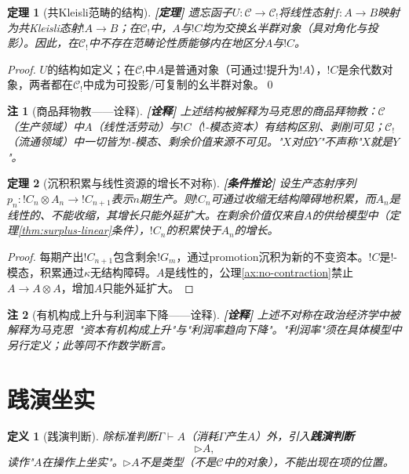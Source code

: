 \documentclass[11pt,a4paper]{article}
\newtheorem{definition}{定义}
\newtheorem{theorem}{定理}
\newtheorem{remark}{注}
\newcommand{\lvl}[1]{\hfill\textbf{\footnotesize[#1]}}
\newcommand{\lvP}{\lvl{定理}}
\newcommand{\lvC}{\lvl{条件推论}}
\newcommand{\lvI}{\lvl{诠释}}
\newcommand{\cat}[1]{\mathcal{#1}}
\newcommand{\C}{\cat{C}}
\newcommand{\bang}{{!}}
\newcommand{\tensor}{\otimes}
\newcommand{\coKl}[1]{\C_{\bang}}
\begin{document}
\begin{theorem}[共Kleisli范畴的结构]\label{thm:fetishism}\lvP
遗忘函子$U:\C\to\coKl{!}$将线性态射$f:A\to B$映射为共Kleisli态射$\bang A\to B$；在$\coKl{!}$中，$A$与$\bang C$均为交换幺半群对象（具对角化与投影）。因此，在$\coKl{!}$中不存在范畴论性质能够内在地区分$A$与$\bang C$。
\end{theorem}

\begin{proof}
$U$的结构如定义；在$\coKl{!}$中$A$是普通对象（可通过$\bang$提升为$\bang A$），$\bang C$是余代数对象，两者都在$\coKl{!}$中成为可投影/可复制的幺半群对象。\qed
\end{proof}

\begin{remark}[商品拜物教——诠释]\lvI
上述结构被解释为马克思的商品拜物教：$\C$（生产领域）中$A$（线性活劳动）与$\bang C$（$\bang$-模态资本）有结构区别、剥削可见；$\coKl{!}$（流通领域）中一切皆为$\bang$-模态、剩余价值来源不可见。"$X$对应$Y$"不声称"$X$就是$Y$"。
\end{remark}

\begin{theorem}[沉积积累与线性资源的增长不对称]\label{thm:organic-composition}\lvC
设生产态射序列$p_n:\bang C_n\tensor A_n\to\bang C_{n+1}$表示$n$期生产。则$\bang C_n$可通过收缩无结构障碍地积累，而$A_n$是线性的、不能收缩，其增长只能外延扩大。在剩余价值仅来自$A$的供给模型中（定理\ref{thm:surplus-linear}条件），$\bang C_n$的积累快于$A_n$的增长。
\end{theorem}

\begin{proof}
每期产出$\bang C_{n+1}$包含剩余$\bang G_m$，通过promotion沉积为新的不变资本。$\bang C$是$\bang$-模态，积累通过$\kappa$无结构障碍。$A$是线性的，公理\ref{ax:no-contraction}禁止$A\to A\tensor A$，增加$A$只能外延扩大。
\end{proof}

\begin{remark}[有机构成上升与利润率下降——诠释]\lvI
上述不对称在政治经济学中被解释为马克思~\cite{marx67}"资本有机构成上升"与"利润率趋向下降"。"利润率"须在具体模型中另行定义；此等同不作数学断言。
\end{remark}

\section{践演坐实}

\begin{definition}[践演判断]\label{def:performative-judgment}
除标准判断$\Gamma\vdash A$（消耗$\Gamma$产生$A$）外，引入\textbf{践演判断}
$$\triangleright A,$$
读作"$A$在操作上坐实"。$\triangleright A$不是类型（不是$\C$中的对象），不能出现在项的位置。
\end{definition}
\end{document}
